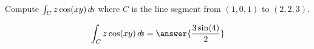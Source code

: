 \documentclass{ximera}
\author{David Guichard \and Neal Koblitz \and H. Jerome Keisler \and Albert Scheller \and Barry Balof \and Mike Wills \and Matthew Carr}
\begin{document}
\begin{exercise}




Compute $\int_C z\cos(xy) \mathop{}\!d\! s$ where $C$ is the line segment from $(1,0,1)$ to $(2,2,3)$.

\begin{prompt}
\[
\int_C z\cos(xy) \d s=\answer{\frac{3\sin(4)}{2}}
\]
\end{prompt}



\end{exercise}
\end{document}
